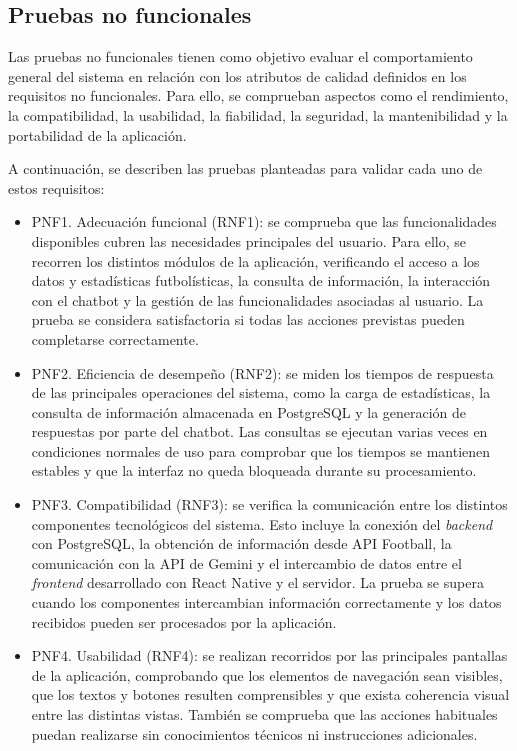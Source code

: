 \subsection{Pruebas no funcionales}

Las pruebas no funcionales tienen como objetivo evaluar el comportamiento general del sistema en relación con los atributos de calidad definidos en los requisitos no funcionales. Para ello, se comprueban aspectos como el rendimiento, la compatibilidad, la usabilidad, la fiabilidad, la seguridad, la mantenibilidad y la portabilidad de la aplicación.

A continuación, se describen las pruebas planteadas para validar cada uno de estos requisitos:

\begin{itemize}

    \item PNF1. Adecuación funcional (RNF1): se comprueba que las funcionalidades disponibles cubren las necesidades principales del usuario. Para ello, se recorren los distintos módulos de la aplicación, verificando el acceso a los datos y estadísticas futbolísticas, la consulta de información, la interacción con el chatbot y la gestión de las funcionalidades asociadas al usuario. La prueba se considera satisfactoria si todas las acciones previstas pueden completarse correctamente.

    \item PNF2. Eficiencia de desempeño (RNF2): se miden los tiempos de respuesta de las principales operaciones del sistema, como la carga de estadísticas, la consulta de información almacenada en PostgreSQL y la generación de respuestas por parte del chatbot. Las consultas se ejecutan varias veces en condiciones normales de uso para comprobar que los tiempos se mantienen estables y que la interfaz no queda bloqueada durante su procesamiento.

    \item PNF3. Compatibilidad (RNF3): se verifica la comunicación entre los distintos componentes tecnológicos del sistema. Esto incluye la conexión del \textit{backend} con PostgreSQL, la obtención de información desde API Football, la comunicación con la API de Gemini y el intercambio de datos entre el \textit{frontend} desarrollado con React Native y el servidor. La prueba se supera cuando los componentes intercambian información correctamente y los datos recibidos pueden ser procesados por la aplicación.

    \item PNF4. Usabilidad (RNF4): se realizan recorridos por las principales pantallas de la aplicación, comprobando que los elementos de navegación sean visibles, que los textos y botones resulten comprensibles y que exista coherencia visual entre las distintas vistas. También se comprueba que las acciones habituales puedan realizarse sin conocimientos técnicos ni instrucciones adicionales.


\end{itemize}
